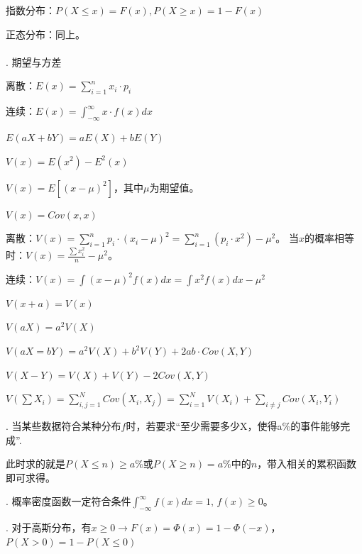 \documentclass[fleqn]{article}
\begin{document}
指数分布：$P(X\leq x)=F(x),P(X\geq x)=1-F(x)$

正态分布：同上。
\\
\\
. 期望与方差

离散：$E(x)=\sum_{i=1}^nx_i\cdot p_i$

连续：$E(x)=\int_{-\infty}^{\infty}x\cdot f(x)dx$

$E(aX+bY)=aE(X)+bE(Y)$

$V(x)=E(x^2)-E^2(x)$

$V(x)=E[(x-\mu)^2]$，其中$\mu$为期望值。

$V(x)=Cov(x,x)$

离散：$V(x)=\sum_{i=1}^np_i\cdot(x_i-\mu)^2=\sum_{i=1}^n(p_i\cdot x^2)-\mu^2$。
当$x$的概率相等时：$V(x)=\frac{\sum x_i^2}{n}-\mu^2$。

连续：$V(x)=\int(x-\mu)^2f(x)dx = \int x^2f(x)dx-\mu^2$

$V(x+a)=V(x)$

$V(aX)=a^2V(X)$

$V(aX=bY)=a^2V(X)+b^2V(Y)+2ab\cdot Cov(X,Y)$

$V(X-Y)=V(X)+V(Y)-2Cov(X,Y)$

$V(\sum X_i)=\sum_{i,j=1}^NCov(X_i,X_j)=\sum_{i=1}^NV(X_i)+\sum_{i\neq j}Cov(X_i,Y_i)$

. 当某些数据符合某种分布$f$时，若要求“至少需要多少X，使得a\%的事件能够完成”.

此时求的就是$P(X\leq n)\geq a\%$或$P(X\geq n)= a\%$中的$n$，带入相关的累积函数即可求得。

. 概率密度函数一定符合条件$\int_{-\infty}^{\infty} f(x)dx=1,\,f(x)\geq 0$。

. 对于高斯分布，有$x\geq 0\rightarrow F(x)=\Phi(x)=1-\Phi(-x)$，$P(X>0)=1-P(X\leq 0)$
\end{document}
